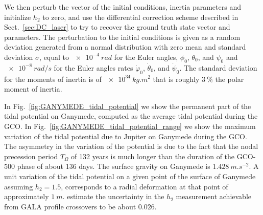 \documentclass[lineno, pdflatex,sn-mathphys-ay]{sn-jnl}
\theoremstyle{thmstyleone}%
\theoremstyle{thmstyletwo}%
\theoremstyle{thmstylethree}%
\begin{document}
%
%
We then perturb the vector of the initial conditions, inertia parameters and initialize $h_2$ to zero, and use the differential correction scheme described in Sect.~\ref{sec:DC_laser} to try to recover the ground truth state vector and parameters.
The perturbation to the initial conditions is given as a random deviation generated from a normal distribution with zero mean and standard deviation $\sigma$, equal to $\SI{e-4}{rad}$ for the Euler angles, $\phi_0$, $\theta_0$, and $\psi_0$ and $\SI{e-8}{rad/s}$ for the Euler angles rates $\dot{\varphi}_0$, $\dot{\theta}_0$, and $\dot{\psi}_0$. The standard deviation for the moments of inertia is of $\SI{e34}{kg.m^2}$ that is roughly $\SI{3}{\%}$ the polar moment of inertia. %
	

In Fig.~\ref{fig:GANYMEDE_tidal_potential} we show the permanent part of the tidal potential on Ganymede, computed as the average tidal potential during the GCO. %
In Fig.~\ref{fig:GANYMEDE_tidal_potential_range} we show the maximum variation of the tidal potential due to Jupiter on Ganymede during the GCO. %
The asymmetry in the variation of the potential is due to the fact that the nodal precession period $T_{\Omega}$ of 132 years is much longer than the duration of the GCO-500 phase of about 136 days.
%
The surface gravity on Ganymede is $\SI{1.428}{m.s^{-2}}$.
A unit variation of the tidal potential on a given point of the surface of Ganymede assuming ${h_2 = 1.5}$, corresponds to a radial deformation at that point of approximately $\SI{1}{m}$.
%
\cite{2015P&SS..117..184S} estimate the uncertainty in the $h_2$ measurement achievable from GALA profile crossovers to be about $0.026$.
\end{document}
